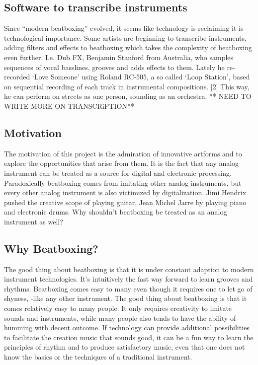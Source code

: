 \subsection{ Software to transcribe instruments }
Since “modern beatboxing” evolved, it seems like technology is reclaiming it is technological importance. Some artists are beginning to transcribe instruments, adding filters and effects to beatboxing which takes the complexity of beatboxing even further. I.e. Dub FX, Benjamin Stanford from Australia, who samples sequences of vocal basslines, grooves and adds effects to them. Lately he re-recorded ‘Love Someone’ using Roland RC-505, a so called ‘Loop Station’, based on sequential recording of each track in instrumental compositions. [2] This way, he can perform on streets as one person, sounding as an orchestra. ** NEED TO WRITE MORE ON TRANSCRiPTION**
\subsection{ Motivation }
The motivation of this project is the admiration of innovative artforms and to explore the opportunities that arise from them. It is the fact that any analog instrument can be treated as a source for digital and electronic processing. Paradoxically beatboxing comes from imitating other analog instruments, but every other analog instrument is also victimized by digitalization. Jimi Hendrix pushed the creative scope of playing guitar, Jean Michel Jarre by playing piano and electronic drums. Why shouldn’t beatboxing be treated as an analog instrument as well? 
\subsection{ Why Beatboxing? }
The good thing about beatboxing is that it is under constant adaption to modern instrument technologies. It’s intuitively the fast way forward to learn grooves and rhythms. Beatboxing comes easy to many even though it requires one to let go of shyness, -like any other instrument. The good thing about beatboxing is that it comes relatively easy to many people. It only requires creativity to imitate sounds and instruments, while many people also tends to have the ability of humming with decent outcome. If technology can provide additional possibilities to facilitate the creation music that sounds good, it can be a fun way to learn the principles of rhythm and to produce satisfactory music, even that one does not know the basics or the techniques of a traditional instrument. 